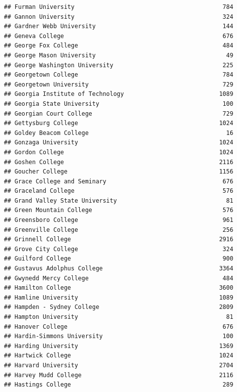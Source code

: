 \documentclass[
]{article}
\begin{document}
\begin{verbatim}
## Furman University                                          784
## Gannon University                                          324
## Gardner Webb University                                    144
## Geneva College                                             676
## George Fox College                                         484
## George Mason University                                     49
## George Washington University                               225
## Georgetown College                                         784
## Georgetown University                                      729
## Georgia Institute of Technology                           1089
## Georgia State University                                   100
## Georgian Court College                                     729
## Gettysburg College                                        1024
## Goldey Beacom College                                       16
## Gonzaga University                                        1024
## Gordon College                                            1024
## Goshen College                                            2116
## Goucher College                                           1156
## Grace College and Seminary                                 676
## Graceland College                                          576
## Grand Valley State University                               81
## Green Mountain College                                     576
## Greensboro College                                         961
## Greenville College                                         256
## Grinnell College                                          2916
## Grove City College                                         324
## Guilford College                                           900
## Gustavus Adolphus College                                 3364
## Gwynedd Mercy College                                      484
## Hamilton College                                          3600
## Hamline University                                        1089
## Hampden - Sydney College                                  2809
## Hampton University                                          81
## Hanover College                                            676
## Hardin-Simmons University                                  100
## Harding University                                        1369
## Hartwick College                                          1024
## Harvard University                                        2704
## Harvey Mudd College                                       2116
## Hastings College                                           289

\end{verbatim}
\end{document}
